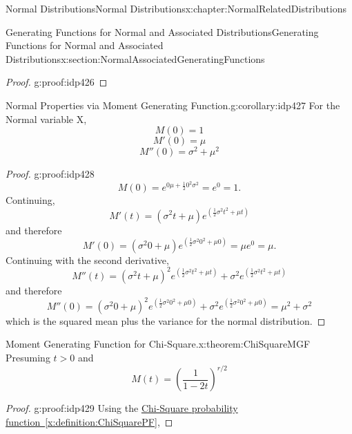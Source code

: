\documentclass[oneside,10pt,]{book}
\newcommand{\xreffont}{\relax}
\numberwithin{equation}{section}
\newcommand{\gt}{>}
\begin{document}
\begin{chapterptx}{Normal Distributions}{}{Normal Distributions}{}{}{x:chapter:NormalRelatedDistributions}
\begin{sectionptx}{Generating Functions for Normal and Associated Distributions}{}{Generating Functions for Normal and Associated Distributions}{}{}{x:section:NormalAssociatedGeneratingFunctions}
\begin{proof}{}{g:proof:idp426}
\end{proof}
 \begin{corollary}{Normal Properties via Moment Generating Function.}{}{g:corollary:idp427}%
For the Normal variable X,%
\begin{equation*}
M(0) = 1
\end{equation*}
%
\begin{equation*}
M'(0) = \mu
\end{equation*}
%
\begin{equation*}
M''(0) = \sigma^2 + \mu^2
\end{equation*}
%
\end{corollary}
\begin{proof}{}{g:proof:idp428}
%
\begin{equation*}
M(0) = e^{0 \mu+\frac{1}{2}0^2\sigma^2} = e^0 = 1.
\end{equation*}
Continuing,%
\begin{equation*}
M'(t) = {\left(\sigma^2 t + \mu \right)} e^{\left(\frac{1}{2} \sigma^2 t^{2} + \mu t \right)}
\end{equation*}
and therefore%
\begin{equation*}
M'(0) = {\left(\sigma^2 0 + \mu \right)} e^{\left(\frac{1}{2} \sigma^2 0^{2} + \mu 0 \right)} = \mu e^0 = \mu.
\end{equation*}
Continuing with the second derivative,%
\begin{equation*}
M''(t) = {\left(\sigma^2 t + \mu\right)}^2 e^{\left(\frac{1}{2} \sigma^2 t^2 + \mu t\right)} + \sigma^2 e^{\left(\frac{1}{2} \sigma^2 t^2 + \mu t\right)}
\end{equation*}
and therefore%
\begin{equation*}
M''(0) = {\left(\sigma^2 0 + \mu\right)}^2 e^{\left(\frac{1}{2} \sigma^2 0^2 + \mu 0\right)} + \sigma^2 e^{\left(\frac{1}{2} \sigma^2 0^2 + \mu 0\right)} = \mu^2 + \sigma^2 
\end{equation*}
which is the squared mean plus the variance for the normal distribution.%
\end{proof}
%
\par
\begin{theorem}{Moment Generating Function for Chi-Square.}{}{x:theorem:ChiSquareMGF}%
Presuming \(t \gt 0\) and%
\begin{equation*}
M(t) = \left ( \frac{1}{1-2t} \right )^{r/2}
\end{equation*}
%
\end{theorem}
\begin{proof}{}{g:proof:idp429}
Using the \hyperref[x:definition:ChiSquarePF]{Chi-Square probability function~{\xreffont\ref{x:definition:ChiSquarePF}}},%

\end{proof}
\end{sectionptx}
\end{chapterptx}
\end{document}

